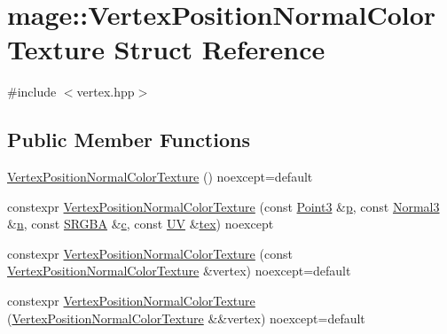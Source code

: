 \hypertarget{structmage_1_1_vertex_position_normal_color_texture}{}\section{mage\+:\+:Vertex\+Position\+Normal\+Color\+Texture Struct Reference}
\label{structmage_1_1_vertex_position_normal_color_texture}


{\ttfamily \#include $<$vertex.\+hpp$>$}

\subsection*{Public Member Functions}
\begin{DoxyCompactItemize}
\item 
\hyperlink{structmage_1_1_vertex_position_normal_color_texture_a50e877f0cef0e1422d5053a911c877ec}{Vertex\+Position\+Normal\+Color\+Texture} () noexcept=default
\item 
constexpr \hyperlink{structmage_1_1_vertex_position_normal_color_texture_aebe5436c626ab479073f9293777394de}{Vertex\+Position\+Normal\+Color\+Texture} (const \hyperlink{structmage_1_1_point3}{Point3} \&\hyperlink{structmage_1_1_vertex_position_normal_color_texture_ac7808865ca6672b7d0f4f8457077bd16}{p}, const \hyperlink{structmage_1_1_normal3}{Normal3} \&\hyperlink{structmage_1_1_vertex_position_normal_color_texture_a7304bf677ad4f16aea974e63f4324eba}{n}, const \hyperlink{structmage_1_1_s_r_g_b_a}{S\+R\+G\+BA} \&\hyperlink{structmage_1_1_vertex_position_normal_color_texture_a65ebae1d87000c53290ac7fd44f0bfce}{c}, const \hyperlink{structmage_1_1_u_v}{UV} \&\hyperlink{structmage_1_1_vertex_position_normal_color_texture_a3477ce06d0778a1119cbf2e961d7c3ed}{tex}) noexcept
\item 
constexpr \hyperlink{structmage_1_1_vertex_position_normal_color_texture_a3776106a96980079a321e7fd66605cb2}{Vertex\+Position\+Normal\+Color\+Texture} (const \hyperlink{structmage_1_1_vertex_position_normal_color_texture}{Vertex\+Position\+Normal\+Color\+Texture} \&vertex) noexcept=default
\item 
constexpr \hyperlink{structmage_1_1_vertex_position_normal_color_texture_ae453b2d23359d907f13a377d03221a0a}{Vertex\+Position\+Normal\+Color\+Texture} (\hyperlink{structmage_1_1_vertex_position_normal_color_texture}{Vertex\+Position\+Normal\+Color\+Texture} \&\&vertex) noexcept=default
\item 

\end{DoxyCompactItemize}

